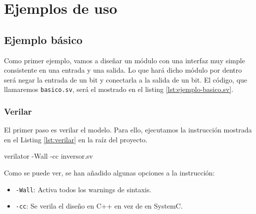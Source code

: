 \chapter{Ejemplos de uso}\label{cap:ejemplos}

\section{Ejemplo básico}\label{sec:basico}
Como primer ejemplo, vamos a diseñar un módulo con una interfaz muy simple consistente en una entrada y una salida. Lo que hará dicho módulo por dentro será negar la entrada de un bit y conectarla a la salida de un bit. El código, que llamaremos \verb|basico.sv|, será el mostrado en el listing \ref{lst:ejemplo-basico.sv}.



\subsection{Verilar}
El primer paso es verilar el modelo. Para ello, ejecutamos la instrucción mostrada en el Listing \ref{lst:verilar} en la raíz del proyecto.

\begin{mycode}[style=bashstyle, label=lst:verilar, caption={Instrucción para verilar el diseño.}]
verilator -Wall -cc inversor.sv
\end{mycode}

\vspace{10pt}
Como se puede ver, se han añadido algunas opciones a la instrucción:

\begin{itemize}
	\item \verb|-Wall|: Activa todos los warnings de sintaxis.
	\item \verb|-cc|: Se verila el diseño en C++ en vez de en SystemC. 
\end{itemize}

